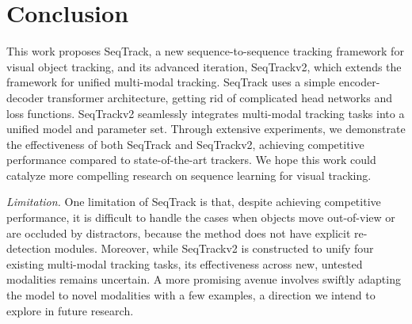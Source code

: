 \section{Conclusion}
\label{sec:conclusion}
This work proposes SeqTrack, a new sequence-to-sequence tracking framework for visual object tracking, and its advanced iteration, SeqTrackv2, which extends the framework for unified multi-modal tracking. SeqTrack uses a simple encoder-decoder transformer architecture, getting rid of complicated head networks and loss functions. SeqTrackv2 seamlessly integrates multi-modal tracking tasks into a unified model and parameter set. Through extensive experiments, we demonstrate the effectiveness of both SeqTrack and SeqTrackv2, achieving competitive performance compared to state-of-the-art trackers. We hope this work could catalyze more compelling research on sequence learning for visual tracking.

\emph{Limitation.}
One limitation of SeqTrack is that, despite achieving competitive performance, it is difficult to handle the cases when objects move out-of-view or are occluded by distractors, because the method does not have explicit re-detection modules.
Moreover, while SeqTrackv2 is constructed to unify four existing multi-modal tracking tasks, its effectiveness across new, untested modalities remains uncertain. A more promising avenue involves swiftly adapting the model to novel modalities with a few examples, a direction we intend to explore in future research.

\vfill

